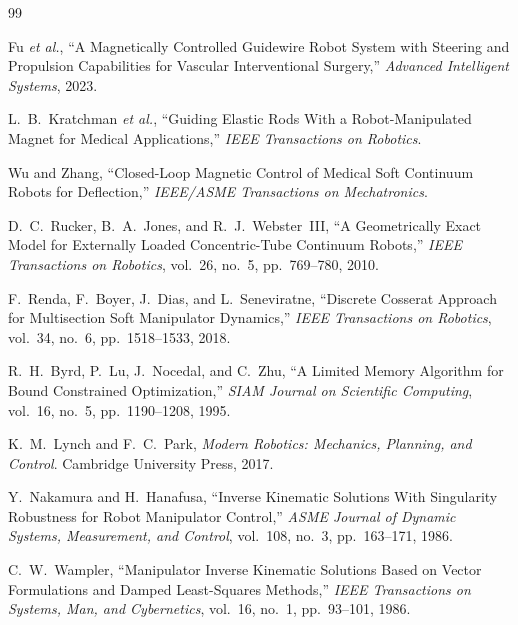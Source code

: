 \documentclass[journal]{IEEEtran}
\begin{document}
\begin{thebibliography}{99}

Fu \emph{et al.}, ``A Magnetically Controlled Guidewire Robot System with
Steering and Propulsion Capabilities for Vascular Interventional
Surgery,'' \emph{Advanced Intelligent Systems}, 2023.

L.~B.~Kratchman \emph{et al.}, ``Guiding Elastic Rods With a
Robot-Manipulated Magnet for Medical Applications,'' \emph{IEEE
Transactions on Robotics}.

Wu and Zhang, ``Closed-Loop Magnetic Control of Medical Soft Continuum
Robots for Deflection,'' \emph{IEEE/ASME Transactions on Mechatronics}.

D.~C.~Rucker, B.~A.~Jones, and R.~J.~Webster~III, ``A Geometrically Exact
Model for Externally Loaded Concentric-Tube Continuum Robots,'' \emph{IEEE
Transactions on Robotics}, vol.~26, no.~5, pp.~769--780, 2010.

F.~Renda, F.~Boyer, J.~Dias, and L.~Seneviratne, ``Discrete Cosserat
Approach for Multisection Soft Manipulator Dynamics,'' \emph{IEEE
Transactions on Robotics}, vol.~34, no.~6, pp.~1518--1533, 2018.

R.~H.~Byrd, P.~Lu, J.~Nocedal, and C.~Zhu, ``A Limited Memory Algorithm
for Bound Constrained Optimization,'' \emph{SIAM Journal on Scientific
Computing}, vol.~16, no.~5, pp.~1190--1208, 1995.

K.~M.~Lynch and F.~C.~Park, \emph{Modern Robotics: Mechanics, Planning,
and Control}. Cambridge University Press, 2017.

Y.~Nakamura and H.~Hanafusa, ``Inverse Kinematic Solutions With
Singularity Robustness for Robot Manipulator Control,'' \emph{ASME Journal
of Dynamic Systems, Measurement, and Control}, vol.~108, no.~3,
pp.~163--171, 1986.

C.~W.~Wampler, ``Manipulator Inverse Kinematic Solutions Based on Vector
Formulations and Damped Least-Squares Methods,'' \emph{IEEE Transactions
on Systems, Man, and Cybernetics}, vol.~16, no.~1, pp.~93--101, 1986.


\end{thebibliography}
\end{document}
